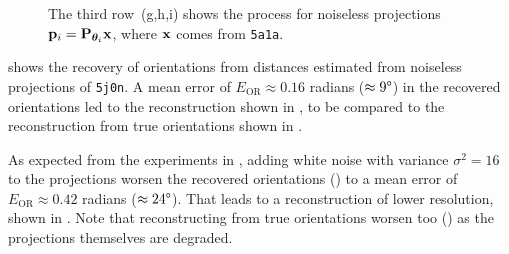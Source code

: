 \begin{figure}[t]
{        The third row~(g,h,i) shows the process for noiseless projections $\mathbf{p}_i = \mathbf{P}_{{\boldsymbol{\theta}}_i} \mathbf{x}$, where $\mathbf{x}$ comes from \texttt{5a1a}.
    }
\end{figure}

 shows the recovery of orientations from distances estimated from noiseless projections of \texttt{5j0n}.
A mean error of $E_\text{OR} \approx 0.16$ radians ($\approx 9\degree$) in the recovered orientations led to the reconstruction shown in , to be compared to the reconstruction from true orientations shown in .


As expected from the experiments in , adding white noise with variance $\sigma^2=16$ to the projections worsen the recovered orientations () to a mean error of $E_\text{OR} \approx 0.42$ radians ($\approx 24\degree$).
That leads to a reconstruction of lower resolution, shown in .
Note that reconstructing from true orientations worsen too  () as the projections themselves are degraded.


